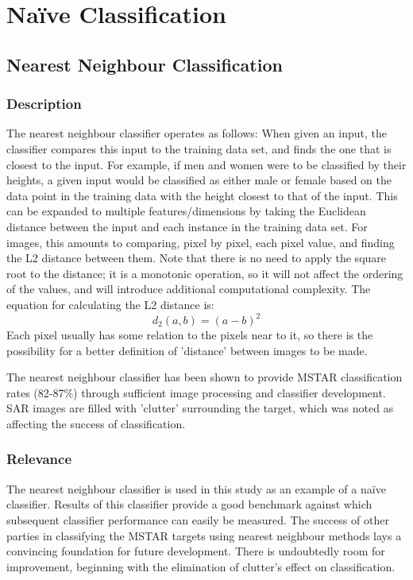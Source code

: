 \section{Na{\"i}ve Classification}


\subsection{Nearest Neighbour Classification}\label{lit:nn}
\subsubsection{Description}
The nearest neighbour classifier operates as follows:
When given an input, the classifier compares this input to the training data set, and finds the one that is closest to the input. For example, if men and women were to be classified by their heights, a given input would be classified as either male or female based on the data point in the training data with the height closest to that of the input. This can be expanded to multiple features/dimensions by taking the Euclidean distance between the input and each instance in the training data set. For images, this amounts to comparing, pixel by pixel, each pixel value, and finding the L2 distance between them\cite{keller1985fuzzy}. Note that there is no need to apply the square root to the distance; it is a monotonic operation, so it will not affect the ordering of the values, and will introduce additional computational complexity. The equation for calculating the L2 distance is:
\[ d_2(a,b) = (a - b)^2  \]
 Each pixel usually has some relation to the pixels near to it, so there is the possibility for a better definition of 'distance' between images to be made\cite{IMED, Michie94machinelearning}.
 
The nearest neighbour classifier has been shown to provide MSTAR classification rates (82-87\%) through sufficient image processing and classifier development. SAR images are filled with 'clutter' surrounding the target, which was noted as affecting the success of classification\cite{Schumacher_atrof}.

\subsubsection{Relevance}
The nearest neighbour classifier is used in this study as an example of a na{\"i}ve classifier. Results of this classifier provide a good benchmark against which subsequent classifier performance can easily be measured. The success of other parties in classifying the MSTAR targets using nearest neighbour methods lays a convincing foundation for future development. There is undoubtedly room for improvement, beginning with the elimination of clutter's effect on classification.


